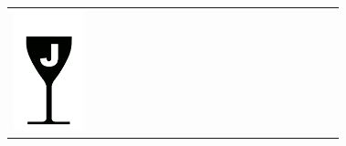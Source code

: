 {\begin{center}
\begin{tabular}{ >{\centering\arraybackslash}p{0.18\linewidth}  >{\centering\arraybackslash}p{0.18\linewidth}  >{\centering\arraybackslash}p{0.18\linewidth}  >{\centering\arraybackslash}p{0.18\linewidth}}
\includegraphics[scale=0.021, trim= 0em -5em -5em -5em,]{Icones/icon_jura_black.pdf}
&

\end{tabular}
\end{center}}
